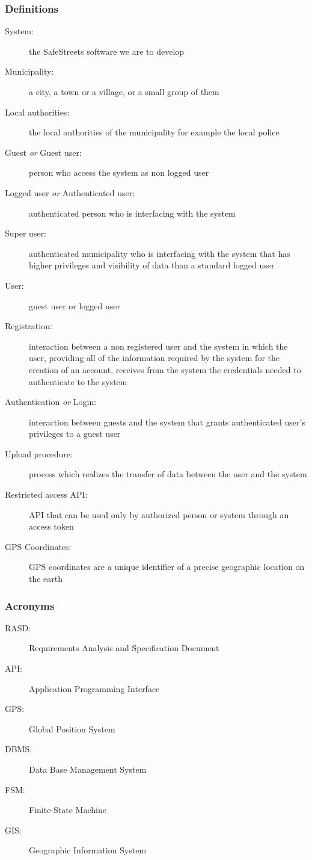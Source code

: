 	\subsubsection{Definitions}
	\begin{description}
		\item[System:]the SafeStreets software we are to develop
		\item[Municipality:] a city, a town or a village, or a small group of them
		\item[Local authorities:] the local authorities of the municipality for example the local police
		\item[Guest \emph{or} Guest user:] person who access the system as non logged user
		\item[Logged user \emph{or} Authenticated user:] authenticated person who is interfacing with the system
		\item[Super user:] authenticated municipality who is interfacing with the system that has higher privileges and visibility of data than a standard logged user
		\item[User:] guest user or logged user
		\item[Registration:]  interaction between a non registered user and the system in which the user, providing all of the information required by the system for the creation of an account, receives from the system the credentials needed to authenticate to the system
		\item[Authentication \emph{or} Login:] interaction between guests and the system that grants authenticated user's privileges to a guest user
		\item[Upload procedure:] process which realizes the transfer of data between the user and the system
		\item[Restricted access API:] API that can be used only by authorized person or system through an access token
		\item[GPS Coordinates:] GPS coordinates are a unique identifier of a precise geographic location on the earth
	\end{description}
\subsubsection{Acronyms}
	\begin{description}
		\item [RASD:] Requirements Analysis and Specification Document
		\item [API:] Application Programming Interface
		\item [GPS:] Global Position System
		\item [DBMS:] Data Base Management System
		\item [FSM:] Finite-State Machine
		\item [GIS:] Geographic Information System
	\end{description}
